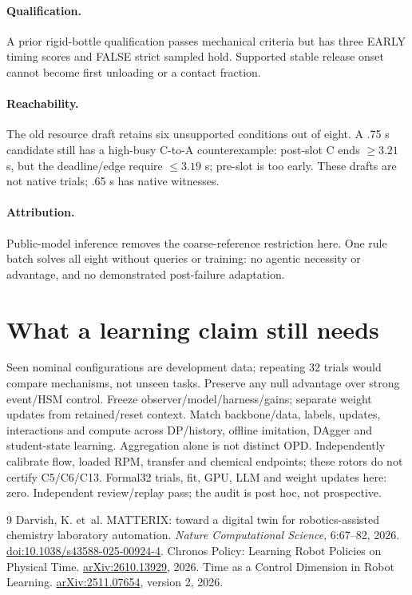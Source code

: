\documentclass{article}
\begin{document}
\paragraph{Qualification.}
A prior rigid-bottle qualification passes mechanical criteria but has
three EARLY timing scores and FALSE strict sampled hold. Supported
stable release onset cannot become first unloading or a contact fraction.

\paragraph{Reachability.}
The old resource draft retains six unsupported conditions out of eight.
A .75 s candidate still has a high-busy C-to-A counterexample: post-slot
C ends $\ge3.21$ s, but the deadline/edge require $\le3.19$ s; pre-slot
is too early. These drafts are not native trials; .65 s has native witnesses.

\paragraph{Attribution.}
Public-model inference removes the coarse-reference restriction here.
One rule batch solves all eight without queries or training: no agentic
necessity or advantage, and no demonstrated post-failure adaptation.

\section{What a learning claim still needs}
Seen nominal configurations are development data; repeating 32 trials
would compare mechanisms, not unseen tasks. Preserve any null advantage
over strong event/HSM control. Freeze observer/model/harness/gains;
separate weight updates from retained/reset context. Match backbone/data, labels, updates, interactions and compute across
DP/history, offline imitation, DAgger and student-state learning.
Aggregation alone is not distinct OPD. Independently calibrate flow,
loaded RPM, transfer and chemical endpoints; these rotors do not certify
C5/C6/C13. Formal32 trials, fit, GPU, LLM and weight updates here: zero.
Independent review/replay pass; the audit is post hoc, not prospective.

\begin{thebibliography}{9}
Darvish, K. et~al. MATTERIX: toward a digital twin for robotics-assisted
chemistry laboratory automation.
\emph{Nature Computational Science}, 6:67--82, 2026.
\href{https://doi.org/10.1038/s43588-025-00924-4}{doi:10.1038/s43588-025-00924-4}.
Chronos Policy: Learning Robot Policies on Physical Time.
\href{https://arxiv.org/abs/2610.13929}{arXiv:2610.13929}, 2026.
Time as a Control Dimension in Robot Learning.
\href{https://arxiv.org/abs/2511.07654}{arXiv:2511.07654}, version 2, 2026.
\end{thebibliography}
\end{document}
